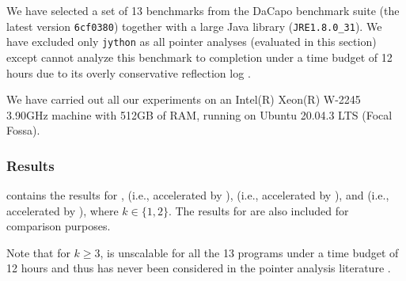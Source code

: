 

We have selected a set of  13 benchmarks from  the DaCapo benchmark suite (the latest version \texttt{6cf0380})
together with a large Java library (\texttt{JRE1.8.0\_31}).
 We have excluded only \texttt{jython} as  all pointer analyses (evaluated in this section) except \spark cannot analyze this benchmark to completion under a time budget of 12 hours due to its overly conservative reflection log \cite{thiessen2017context}.


We have carried out all our experiments on an Intel(R) Xeon(R) W-2245 3.90GHz machine with 512GB of RAM, running on Ubuntu 20.04.3 LTS (Focal Fossa). 



\subsubsection{Results} 

 contains the results for ,  (i.e.,  accelerated by \tool),   (i.e.,  accelerated by \selectx), and  (i.e.,  accelerated by \zipper), where $k \in \{1, 2\}$.
The results for \spark are also included for comparison
purposes.

Note that for $k\geqslant 3$,
 is unscalable for all the 13 programs 
under a time budget
of 12 hours and thus has never been considered
in the pointer analysis literature 
\cite{lu2021selective, raghothaman2018user,
li2018precision, li2020principled,tan2017efficient, smaragdakis2011pick,jeon2018precise,thiessen2017context}.

